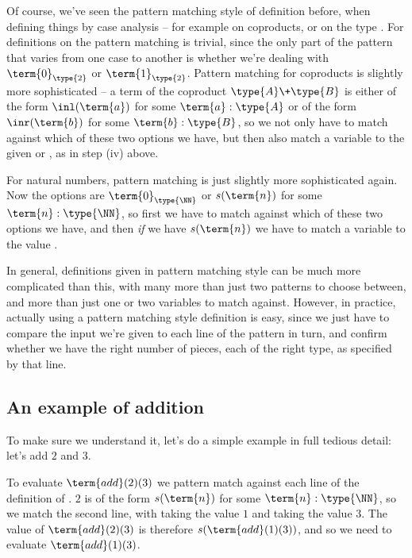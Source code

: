 Of course, we've seen the pattern matching style of definition before, when defining things by case analysis -- for example on coproducts, or on the type .  
For definitions on  the pattern matching is trivial, since the only part of the pattern that varies from one case to another is whether we're dealing with $\term{0}_{\type{2}}$ or $\term{1}_{\type{2}}$.  
Pattern matching for coproducts is slightly more sophisticated -- a term of the coproduct $\type{A} \+ \type{B}$ is either of the form $\inl(\term{a})$ for some $\term{a}:\type{A}$ or of the form $\inr(\term{b})$ for some $\term{b}:\type{B}$, so we not only have to match against which of these two options we have, but then also match a variable to the given  or , as in step (iv) above.

For natural numbers, pattern matching is just slightly more sophisticated again.  Now the options are $\term{0}_{\type{\NN}}$ or $s(\term{n})$ for some $\term{n}:\type{\NN}$, so first we have to match against which of these two options we have, and then \emph{if} we have $s(\term{n})$ we have to match a variable to the value .

In general, definitions given in pattern matching style can be much more complicated than this, with many more than just two patterns to choose between, and more than just one or two variables to match against.  However, in practice, actually using a pattern matching style definition is easy, since we just have to compare the input we're given to each line of the pattern in turn, and confirm whether we have the right number of pieces, each of the right type, as specified by that line.





\subsection{An example of addition}
\label{sec:NaturalNumbers-ExampleAddition}

To make sure we understand it, let's do a simple example in full tedious detail: let's add $2$ and $3$.  %

To evaluate
$\term{add}(2)(3)$ we pattern match against each line of the definition of .  $2$ is of the form $s(\term{n})$ for some $\term{n}:\type{\NN}$, so we match the second line, with  taking the value $1$ and  taking the value $3$.  The value of $\term{add}(2)(3)$ is therefore 
$s(\term{add}(1)(3))$, and so we need to evaluate $\term{add}(1)(3)$.

